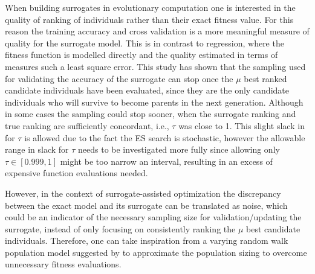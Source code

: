 When building surrogates in evolutionary computation one is interested in the quality of ranking of individuals  rather than their exact fitness value. For this reason the training accuracy and cross validation is a more meaningful measure of quality for the surrogate model. This is in contrast to regression, where the fitness function is modelled directly and the quality estimated in terms of measures such a least square error. 
This study has shown that the sampling used for validating the accuracy of the surrogate can stop once the $\mu$ best ranked candidate individuals have been evaluated, since they are the only candidate individuals who will survive to become parents in the next generation. 
Although in some cases the sampling could stop sooner, when the surrogate ranking and true ranking are sufficiently concordant, i.e.,  $\tau$ was close to 1. This slight slack in for $\tau$ is allowed due to the fact the ES search is stochastic, however the allowable range in slack for $\tau$ needs to be investigated more fully %
since allowing only $\tau\in[0.999,1]$ might be too narrow an interval, resulting in an excess of expensive function evaluations needed. %

However, in the context of surrogate-assisted optimization the discrepancy between the exact model and its surrogate can be translated as noise, which could be an indicator of the necessary sampling size for validation/updating the surrogate, instead of only focusing on consistently ranking the $\mu$ best candidate individuals. Therefore, one can take inspiration from a varying random walk population model suggested by \cite{Miller97} to approximate the population sizing to overcome unnecessary fitness evaluations.
